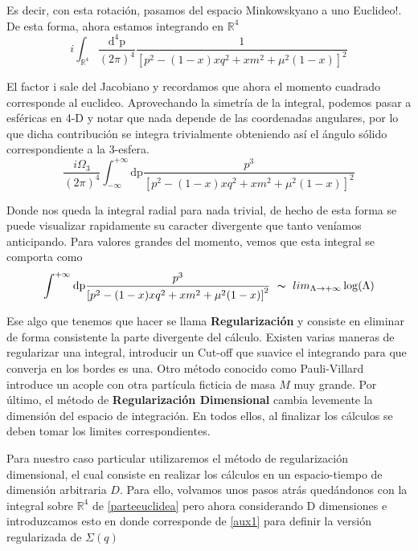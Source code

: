 \documentclass{article}
\numberwithin{equation}{section}
\begin{document}
Es decir, con esta rotación, pasamos del espacio Minkowskyano a uno
Euclideo!. De esta forma, ahora estamos integrando en $\mathbb{R}^{4}$
\begin{equation}\label{parteeuclidea}
i\int_{\mathbb{R}^{4}}\frac{\mathrm{\mathrm{d^4}p}}{(2\pi)^{4}}\frac{1}{\left[p^{2}-(1-x)xq^{2} + x m^{2} + \mu^{2}(1-x)\right]^{2}}
\end{equation}

El factor i sale del Jacobiano y recordamos que ahora el momento cuadrado corresponde al
euclideo. Aprovechando la simetría de la integral, podemos pasar a esféricas
en 4-D y notar que nada depende de las coordenadas angulares, por lo que dicha contribución se integra trivialmente obteniendo así el ángulo sólido correspondiente a la 3-esfera. 
\begin{equation}
\frac{i\Omega_{3}}{(2\pi)^{4}}\int_{-\infty}^{+\infty}\mathrm{dp}\frac{p^{3}}{\left[p^{2}-(1-x)xq^{2} + x m^{2} + \mu^{2}(1-x)\right]^{2}}
\end{equation}

Donde nos queda la integral radial para nada trivial, de hecho de esta forma se puede visualizar rapidamente su caracter divergente que tanto veníamos anticipando. Para valores grandes del momento, vemos que esta integral se comporta como
\begin{equation}
\int^{+\infty}\mathrm{dp}\frac{p^{3}}{\left[p^{2}-(1-x)xq^{2} + x m^{2} + \mu^{2}(1-x)\right]^{2}}\ \thicksim\ lim_{\Lambda\rightarrow+\infty}\log(\Lambda)
\end{equation}

Ese algo que tenemos que hacer se llama \textbf{Regularización} y consiste en eliminar de forma consistente la parte divergente del cálculo. Existen varias maneras de regularizar una integral,
introducir un Cut-off que suavice el integrando para que converja
en los bordes es una. Otro método conocido como Pauli-Villard introduce un acople
con otra partícula ficticia de masa $ M $ muy grande. Por último, el método de \textbf{Regularización Dimensional} cambia levemente la dimensión del espacio de integración.
En todos ellos, al finalizar los cálculos se deben tomar los limites
correspondientes. 

Para nuestro caso particular utilizaremos el método
de regularización dimensional, el cual consiste en realizar los cálculos en un espacio-tiempo de dimensión arbitraria $ D $. Para ello, volvamos unos pasos atrás quedándonos con la integral sobre $ \mathbb{R}^4 $ de \ref{parteeuclidea} pero ahora considerando D dimensiones e introduzcamos esto en donde corresponde de \ref{aux1} para definir la versión regularizada de $ \Sigma(q) $
\end{document}
